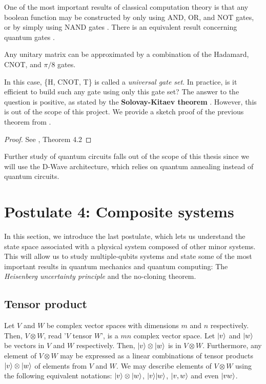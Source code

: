 One of the most important results of classical computation theory is that any boolean function may be constructed by only using AND, OR, and NOT gates, or by simply using NAND gates \cite{Lau2006}. There is an equivalent result concerning quantum gates \cite{Bayens2019}.

\begin{theorem}
	Any unitary matrix can be approximated by a combination of the Hadamard, CNOT, and $\pi/8$ gates.
\end{theorem}

In this case, \{H, CNOT, T\} is called a \emph{universal gate set}. In practice, is it efficient to build such any gate using only this gate set? The answer to the question is positive, as stated by the \textbf{Solovay-Kitaev theorem} \cite{Dawson2006}. However, this is out of the scope of this project. We provide a sketch proof of the previous theorem from \cite{Bayens2019}.

\begin{proof}
	See \cite{Bayens2019}, Theorem 4.2
\end{proof}

Further study of quantum circuits falls out of the scope of this thesis since we will use the D-Wave architecture, which relies on quantum annealing instead of quantum circuits.


\section{Postulate 4: Composite systems}


In this section, we introduce the last postulate, which lets us understand the state space associated with a physical system composed of other minor systems. This will allow us to study multiple-qubits systems and state some of the most important results in quantum mechanics and quantum computing: The \emph{Heisenberg uncertainty principle} and the no-cloning theorem.


\subsection{Tensor product}


Let $V$ and $W$ be complex vector spaces with dimensions $m$ and $n$ respectively. Then, $V \otimes W$, read '$V$ tensor $W$', is a $mn$ complex vector space. Let $|v\rangle$ and $|w\rangle$ be vectors in $V$ and $W$ respectively. Then, $|v\rangle \otimes |w\rangle$ is in $V \otimes W$. Furthermore, any element of $V \otimes W$ may be expressed as a linear combinations of tensor products $|v\rangle \otimes |w\rangle$ of elements from $V$ and $W$. We may describe elements of $V \otimes W$ using the following equivalent notations: $|v\rangle \otimes |w\rangle$, $|v\rangle|w\rangle$, $|v, w\rangle$ and even $|vw\rangle$.

